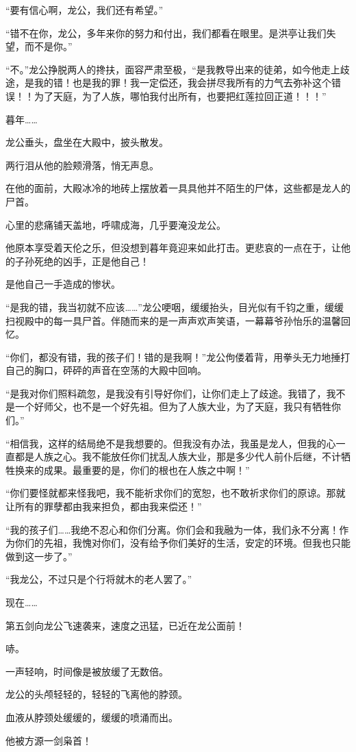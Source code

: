 \begin{this_body}
“要有信心啊，龙公，我们还有希望。”

“错不在你，龙公，多年来你的努力和付出，我们都看在眼里。是洪亭让我们失望，而不是你。”

“不。”龙公挣脱两人的搀扶，面容严肃至极，“是我教导出来的徒弟，如今他走上歧途，是我的错！也是我的罪！我一定偿还，我会拼尽我所有的力气去弥补这个错误！！为了天庭，为了人族，哪怕我付出所有，也要把红莲拉回正道！！！”

暮年……

龙公垂头，盘坐在大殿中，披头散发。

两行泪从他的脸颊滑落，悄无声息。

在他的面前，大殿冰冷的地砖上摆放着一具具他并不陌生的尸体，这些都是龙人的尸首。

心里的悲痛铺天盖地，呼啸成海，几乎要淹没龙公。

他原本享受着天伦之乐，但没想到暮年竟迎来如此打击。更悲哀的一点在于，让他的子孙死绝的凶手，正是他自己！

是他自己一手造成的惨状。

“是我的错，我当初就不应该……”龙公哽咽，缓缓抬头，目光似有千钧之重，缓缓扫视殿中的每一具尸首。伴随而来的是一声声欢声笑语，一幕幕爷孙怡乐的温馨回忆。

“你们，都没有错，我的孩子们！错的是我啊！”龙公佝偻着背，用拳头无力地捶打自己的胸口，砰砰的声音在空荡的大殿中回响。

“是我对你们照料疏忽，是我没有引导好你们，让你们走上了歧途。我错了，我不是一个好师父，也不是一个好先祖。但为了人族大业，为了天庭，我只有牺牲你们。”

“相信我，这样的结局绝不是我想要的。但我没有办法，我虽是龙人，但我的心一直都是人族之心。我不能放任你们扰乱人族大业，那是多少代人前仆后继，不计牺牲换来的成果。最重要的是，你们的根也在人族之中啊！”

“你们要怪就都来怪我吧，我不能祈求你们的宽恕，也不敢祈求你们的原谅。那就让所有的罪孽都由我来担负，都由我来偿还！”

“我的孩子们……我绝不忍心和你们分离。你们会和我融为一体，我们永不分离！作为你们的先祖，我愧对你们，没有给予你们美好的生活，安定的环境。但我也只能做到这一步了。”

“我龙公，不过只是个行将就木的老人罢了。”

现在……

第五剑向龙公飞速袭来，速度之迅猛，已近在龙公面前！

哧。

一声轻响，时间像是被放缓了无数倍。

龙公的头颅轻轻的，轻轻的飞离他的脖颈。

血液从脖颈处缓缓的，缓缓的喷涌而出。

他被方源一剑枭首！

\end{this_body}

